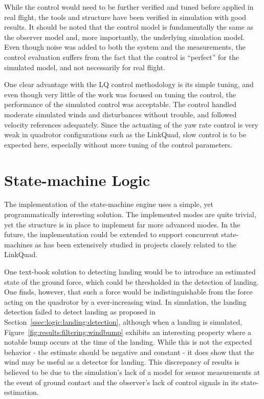         While the control would need to be further verified and tuned before applied in real flight,
        the tools and structure have been verified in simulation with good results.
        It should be noted that the control model is fundamentally the same
        as the observer model and, more importantly, the underlying simulation
        model. Even though noise was added to both the system and the measurements,
        the control evaluation suffers from the fact that the control is ``perfect'' for the
        simulated model, and not necessarily for real flight.

        One clear advantage with the LQ control methodology is its simple
        tuning, and even though very little of the work was focused on
        tuning the control, the performance of the simulated control was acceptable.
        The control handled moderate simulated winds and disturbances without trouble, and
        followed velocity references adequately.
        Since the actuating of the yaw rate control is very weak in
        quadrotor configurations such as the LinkQuad, slow control
        is to be expected here, especially without more tuning of the control
        parameters.

    \section{State-machine Logic}
        The implementation of the state-machine engine uses a simple, yet
        programmatically interesting solution. The implemented modes
        are quite trivial, yet the structure is in place to implement
        far more advanced modes. In the future, the implementation could
        be extended to support concurrent state-machines as has been
        extensively studied in projects closely related to the LinkQuad.

        One text-book solution to detecting landing would be to introduce
        an estimated state of the ground force, which could be thresholded
        in the detection of landing. One finds, however,
        that such a force would be indistinguishable from
        the force acting on the quadrotor by a ever-increasing wind.
        In simulation, the landing detection failed to detect landing
        as proposed in Section~\ref{ssec:logic:landing:detection}, although
        when a landing is simulated, Figure~\ref{fig:results:filtering:windbump}
        exhibits an interesting property where a notable bump occurs at the
        time of the landing. While this is not the expected behavior
        - the estimate should be negative and constant -
        it does show that the wind may be useful as a detector for landing.
        This discrepancy of results is believed to be due to
        the simulation's lack of a model for sensor measurements at the event of ground contact
        and the observer's lack of control signals in its state-estimation.

